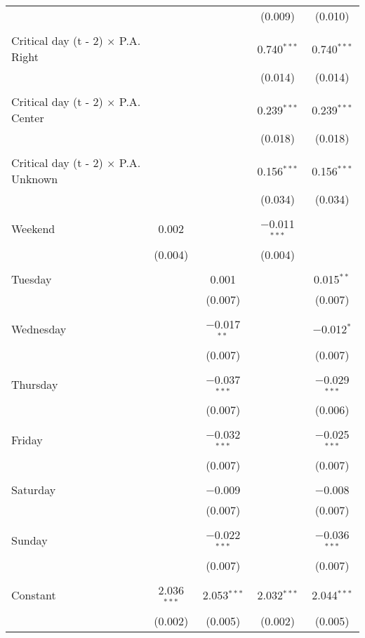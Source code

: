 \documentclass[
]{article}
\begin{document}
\begin{table}[!htbp]
{\begin{tabular}{@{\extracolsep{5pt}}lcccc}
  &  &  & (0.009) & (0.010) \\ 
  & & & & \\ 
 Critical day (t - 2) $\times$ P.A. Right &  &  & 0.740$^{***}$ & 0.740$^{***}$ \\ 
  &  &  & (0.014) & (0.014) \\ 
  & & & & \\ 
 Critical day (t - 2) $\times$ P.A. Center &  &  & 0.239$^{***}$ & 0.239$^{***}$ \\ 
  &  &  & (0.018) & (0.018) \\ 
  & & & & \\ 
 Critical day (t - 2) $\times$ P.A. Unknown &  &  & 0.156$^{***}$ & 0.156$^{***}$ \\ 
  &  &  & (0.034) & (0.034) \\ 
  & & & & \\ 
 Weekend & 0.002 &  & $-$0.011$^{***}$ &  \\ 
  & (0.004) &  & (0.004) &  \\ 
  & & & & \\ 
 Tuesday &  & 0.001 &  & 0.015$^{**}$ \\ 
  &  & (0.007) &  & (0.007) \\ 
  & & & & \\ 
 Wednesday &  & $-$0.017$^{**}$ &  & $-$0.012$^{*}$ \\ 
  &  & (0.007) &  & (0.007) \\ 
  & & & & \\ 
 Thursday &  & $-$0.037$^{***}$ &  & $-$0.029$^{***}$ \\ 
  &  & (0.007) &  & (0.006) \\ 
  & & & & \\ 
 Friday &  & $-$0.032$^{***}$ &  & $-$0.025$^{***}$ \\ 
  &  & (0.007) &  & (0.007) \\ 
  & & & & \\ 
 Saturday &  & $-$0.009 &  & $-$0.008 \\ 
  &  & (0.007) &  & (0.007) \\ 
  & & & & \\ 
 Sunday &  & $-$0.022$^{***}$ &  & $-$0.036$^{***}$ \\ 
  &  & (0.007) &  & (0.007) \\ 
  & & & & \\ 
 Constant & 2.036$^{***}$ & 2.053$^{***}$ & 2.032$^{***}$ & 2.044$^{***}$ \\ 
  & (0.002) & (0.005) & (0.002) & (0.005) \\ 

\end{tabular}}
\end{table}
\end{document}
